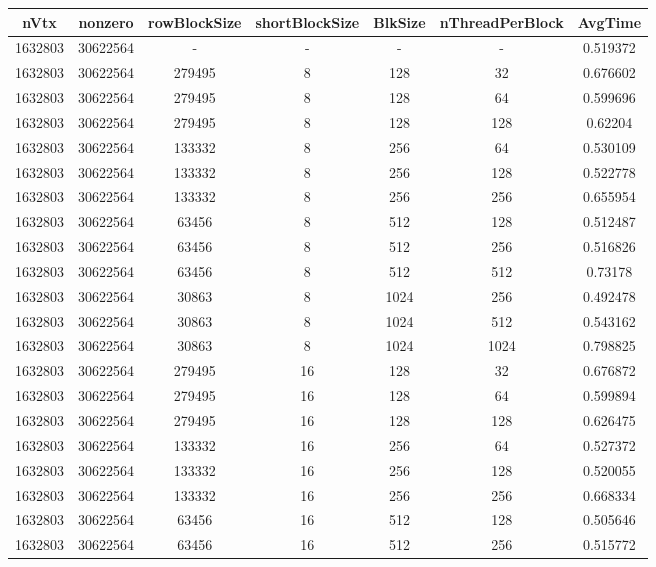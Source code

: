 \documentclass[9pt]{article}
\begin{document}
\SetBgPosition{0.25cm,-5.0cm}
\begin{tabular}{|c|c|c|c|c|c|c| }  
\hline
nVtx  & nonzero  & rowBlockSize  & shortBlockSize  & BlkSize  & nThreadPerBlock  & AvgTime \\
\hline
1632803  & 30622564  &  -  & -  & -  & -  &0.519372 \\
\hline
1632803  & 30622564  & 279495  & 8  & 128  & 32  & 0.676602 \\
\hline
1632803  & 30622564  & 279495  & 8  & 128  & 64  & 0.599696 \\
\hline
1632803  & 30622564  & 279495  & 8  & 128  & 128  & 0.62204 \\
\hline
1632803  & 30622564  & 133332  & 8  & 256  & 64  & 0.530109 \\
\hline
1632803  & 30622564  & 133332  & 8  & 256  & 128  & 0.522778 \\
\hline
1632803  & 30622564  & 133332  & 8  & 256  & 256  & 0.655954 \\
\hline
1632803  & 30622564  & 63456  & 8  & 512  & 128  & 0.512487 \\
\hline
1632803  & 30622564  & 63456  & 8  & 512  & 256  & 0.516826 \\
\hline
1632803  & 30622564  & 63456  & 8  & 512  & 512  & 0.73178 \\
\hline
1632803  & 30622564  & 30863  & 8  & 1024  & 256  & 0.492478 \\
\hline
1632803  & 30622564  & 30863  & 8  & 1024  & 512  & 0.543162 \\
\hline
1632803  & 30622564  & 30863  & 8  & 1024  & 1024  & 0.798825 \\
\hline
1632803  & 30622564  & 279495  & 16  & 128  & 32  & 0.676872 \\
\hline
1632803  & 30622564  & 279495  & 16  & 128  & 64  & 0.599894 \\
\hline
1632803  & 30622564  & 279495  & 16  & 128  & 128  & 0.626475 \\
\hline
1632803  & 30622564  & 133332  & 16  & 256  & 64  & 0.527372 \\
\hline
1632803  & 30622564  & 133332  & 16  & 256  & 128  & 0.520055 \\
\hline
1632803  & 30622564  & 133332  & 16  & 256  & 256  & 0.668334 \\
\hline
1632803  & 30622564  & 63456  & 16  & 512  & 128  & 0.505646 \\
\hline
1632803  & 30622564  & 63456  & 16  & 512  & 256  & 0.515772 \\

\end{tabular}
\end{document}
